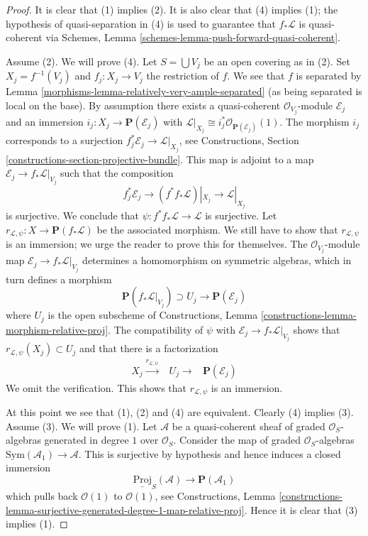 \begin{proof}

It is clear that (1) implies (2). It is also clear that
(4) implies (1); the hypothesis of quasi-separation
in (4) is used to guarantee that $f_*\mathcal{L}$ is quasi-coherent via
Schemes, Lemma \ref{schemes-lemma-push-forward-quasi-coherent}.

\medskip\noindent
Assume (2). We will prove (4).
Let $S = \bigcup V_j$ be an open covering as in (2).
Set $X_j = f^{-1}(V_j)$ and $f_j : X_j \to V_j$ the
restriction of $f$. We see that $f$ is separated by
Lemma \ref{morphisms-lemma-relatively-very-ample-separated} (as being
separated is local on the base). By assumption there exists a
quasi-coherent $\mathcal{O}_{V_j}$-module $\mathcal{E}_j$ and an immersion
$i_j : X_j \to \mathbf{P}(\mathcal{E}_j)$ with
$\mathcal{L}|_{X_j} \cong i_j^*\mathcal{O}_{\mathbf{P}(\mathcal{E}_j)}(1)$.
The morphism $i_j$ corresponds to a surjection
$f_j^*\mathcal{E}_j \to \mathcal{L}|_{X_j}$, see
Constructions, Section \ref{constructions-section-projective-bundle}.
This map is adjoint to a map $\mathcal{E}_j \to f_*\mathcal{L}|_{V_j}$
such that the composition
$$
f_j^*\mathcal{E}_j \to (f^*f_*\mathcal{L})|_{X_j} \to \mathcal{L}|_{X_j}
$$
is surjective. We conclude that
$\psi : f^*f_*\mathcal{L} \to \mathcal{L}$ is surjective. Let
$r_{\mathcal{L}, \psi} : X \to \mathbf{P}(f_*\mathcal{L})$ be the
associated morphism. We still have to show that $r_{\mathcal{L}, \psi}$
is an immersion; we urge the reader to prove this for themselves.
The $\mathcal{O}_{V_j}$-module map $\mathcal{E}_j \to f_*\mathcal{L}|_{V_j}$
determines a homomorphism on symmetric algebras, which in turn defines a
morphism
$$
\mathbf{P}(f_*\mathcal{L}|_{V_j}) \supset U_j \longrightarrow
\mathbf{P}(\mathcal{E}_j)
$$
where $U_j$ is the open subscheme of
Constructions, Lemma \ref{constructions-lemma-morphism-relative-proj}.
The compatibility of $\psi$ with $\mathcal{E}_j \to f_*\mathcal{L}|_{V_j}$
shows that $r_{\mathcal{L}, \psi}(X_j) \subset U_j$ and that there is a
factorization
$$
\begin{array}{ccc}X_j \overset{r_{\mathcal{L}, \psi}}{\longrightarrow} & U_j \longrightarrow & \mathbf{P}(\mathcal{E}_j)\end{array}
$$
We omit the verification.
This shows that $r_{\mathcal{L}, \psi}$ is an immersion.

\medskip\noindent
At this point we see that (1), (2) and (4) are equivalent.
Clearly (4) implies (3). Assume (3). We will prove (1).
Let $\mathcal{A}$ be a quasi-coherent sheaf of graded $\mathcal{O}_S$-algebras
generated in degree $1$ over $\mathcal{O}_S$. Consider the map of
graded $\mathcal{O}_S$-algebras $\text{Sym}(\mathcal{A}_1) \to \mathcal{A}$.
This is surjective by hypothesis and hence induces a closed immersion
$$
\underline{\text{Proj}}_S(\mathcal{A})
\longrightarrow
\mathbf{P}(\mathcal{A}_1)
$$
which pulls back $\mathcal{O}(1)$ to $\mathcal{O}(1)$,
see Constructions, Lemma
\ref{constructions-lemma-surjective-generated-degree-1-map-relative-proj}.
Hence it is clear that (3) implies (1).
\end{proof}

